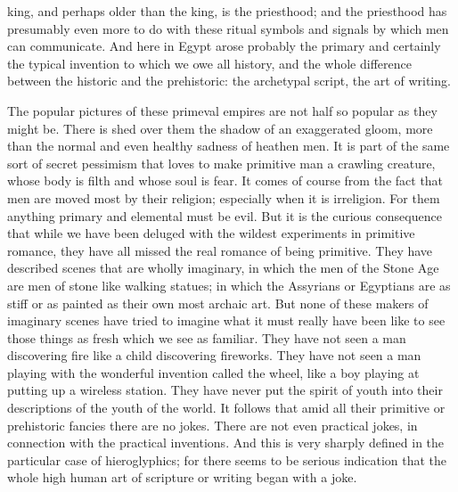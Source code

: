 king, and perhaps older than the king, is the priesthood; and the priesthood has presumably even more to do with these ritual symbols and signals by which men can communicate. And here in Egypt arose probably the primary and certainly the typical invention to which we owe all history, and the whole difference between the historic and the prehistoric: the archetypal script, the art of writing.

The popular pictures of these primeval empires are not half so popular as they might be. There is shed over them the shadow of an exaggerated gloom, more than the normal and even healthy sadness of heathen men. It is part of the same sort of secret pessimism that loves to make primitive man a crawling creature, whose body is filth and whose soul is fear. It comes of course from the fact that men are moved most by their religion; especially when it is irreligion. For them anything primary and elemental must be evil. But it is the curious consequence that while we have been deluged with the wildest experiments in primitive romance, they have all missed the real romance of being primitive. They have described scenes that are wholly imaginary, in which the men of the Stone Age are men of stone like walking statues; in which the Assyrians or Egyptians are as stiff or as painted as their own most archaic art. But none of these makers of imaginary scenes have tried to imagine what it must really have been like to see those things as fresh which we see as familiar. They have not seen a man discovering fire like a child discovering fireworks. They have not seen a man playing with the wonderful invention called the wheel, like a boy playing at putting up a wireless station. They have never put the spirit of youth into their descriptions of the youth of the world. It follows that amid all their primitive or prehistoric fancies there are no jokes. There are not even practical jokes, in connection with the practical inventions. And this is very sharply defined in the particular case of hieroglyphics; for there seems to be serious indication that the whole high human art of scripture or writing began with a joke.

